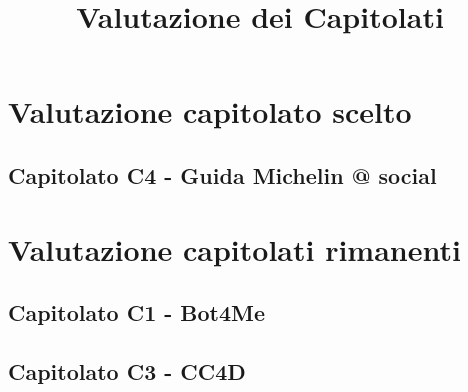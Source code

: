 \documentclass{classes/verbale}
\title{Valutazione dei Capitolati}
\begin{document}
	\maketitle
	\newpage
	\tableofcontents
	
	\newpage
	\section{Valutazione capitolato scelto}
	\subsection{Capitolato C4 - Guida Michelin @ social}
	

	\newpage
	\section{Valutazione capitolati rimanenti}
	\subsection{Capitolato C1 - Bot4Me}
	
	
	\newpage
	\subsection{Capitolato C3 - CC4D}
	
\end{document}
